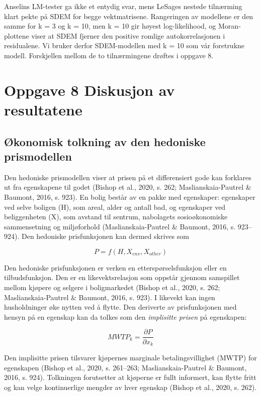 \documentclass[
  norsk,
  a4paper,
]{article}
\begin{document}
Anselins LM-tester ga ikke et entydig svar, mens LeSages nestede
tilnærming klart pekte på SDEM for begge vektmatrisene. Rangeringen av
modellene er den samme for k = 3 og k = 10, men k = 10 gir høyest
log-likelihood, og Moran-plottene viser at SDEM fjerner den positive
romlige autokorrelasjonen i residualene. Vi bruker derfor SDEM-modellen
med k = 10 som vår foretrukne modell. Forskjellen mellom de to
tilnærmingene drøftes i oppgave 8.

\section{Oppgave 8 Diskusjon av
resultatene}\label{oppgave-8-diskusjon-av-resultatene}

\subsection{Økonomisk tolkning av den hedoniske
prismodellen}\label{uxf8konomisk-tolkning-av-den-hedoniske-prismodellen}

Den hedoniske prismodellen viser at prisen på et differensiert gode kan
forklares ut fra egenskapene til godet (Bishop et al., 2020, s. 262;
Maslianskaia-Pautrel \& Baumont, 2016, s. 923). En bolig består av en
pakke med egenskaper: egenskaper ved selve boligen (H), som areal, alder
og antall bad, og egenskaper ved beliggenheten (X), som avstand til
sentrum, nabolagets sosioøkonomiske sammensetning og miljøforhold
(Maslianskaia-Pautrel \& Baumont, 2016, s. 923--924). Den hedoniske
prisfunksjonen kan dermed skrives som

\[P = f(H, X_{env}, X_{other})\]

Den hedoniske prisfunksjonen er verken en etterspørselsfunksjon eller en
tilbudsfunksjon. Den er en likevektsrelasjon som oppstår gjennom
samspillet mellom kjøpere og selgere i boligmarkedet (Bishop et al.,
2020, s. 262; Maslianskaia-Pautrel \& Baumont, 2016, s. 923). I likevekt
kan ingen husholdninger øke nytten ved å flytte. Den deriverte av
prisfunksjonen med hensyn på en egenskap kan da tolkes som den
\emph{implisitte prisen} på egenskapen:

\[MWTP_k = \frac{\partial P}{\partial x_k}\]

Den implisitte prisen tilsvarer kjøpernes marginale betalingsvillighet
(MWTP) for egenskapen (Bishop et al., 2020, s. 261--263;
Maslianskaia-Pautrel \& Baumont, 2016, s. 924). Tolkningen forutsetter
at kjøperne er fullt informert, kan flytte fritt og kan velge
kontinuerlige mengder av hver egenskap (Bishop et al., 2020, s. 262).
\end{document}
